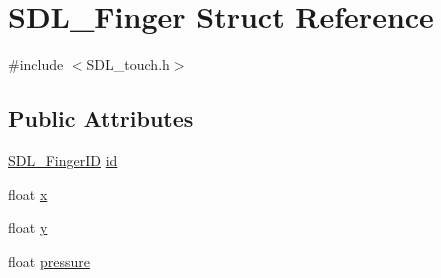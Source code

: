\hypertarget{struct_s_d_l___finger}{\section{S\-D\-L\-\_\-\-Finger Struct Reference}
\label{struct_s_d_l___finger}
}


{\ttfamily \#include $<$S\-D\-L\-\_\-touch.\-h$>$}

\subsection*{Public Attributes}
\begin{DoxyCompactItemize}
\item 
\hyperlink{_s_d_l__touch_8h_a5fa58141f78415ca09645af359ad2250}{S\-D\-L\-\_\-\-Finger\-I\-D} \hyperlink{struct_s_d_l___finger_a3cec630146eeec5bd6299a9387a6f16a}{id}
\item 
float \hyperlink{struct_s_d_l___finger_ab91dfbd03c3215560457fef44e1c7755}{x}
\item 
float \hyperlink{struct_s_d_l___finger_a0a2c7a06ae641940111e03801c672cf9}{y}
\item 
float \hyperlink{struct_s_d_l___finger_a0ecb50c7fd699d59899ac60c941bdee6}{pressure}
\end{DoxyCompactItemize}


